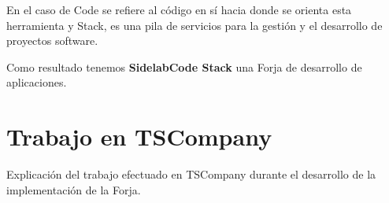 \par En el caso de Code se refiere al c\'odigo en s\'i hacia donde se orienta esta herramienta y Stack, es una pila de servicios para la gesti\'on y el desarrollo de proyectos software.

\par Como resultado tenemos \textbf{SidelabCode Stack} una Forja de desarrollo de aplicaciones.


\section{Trabajo en TSCompany}
\label{sec:trabajo-tscompany}

\par Explicaci\'on del trabajo efectuado en TSCompany durante el desarrollo de la implementaci\'on de la Forja.

